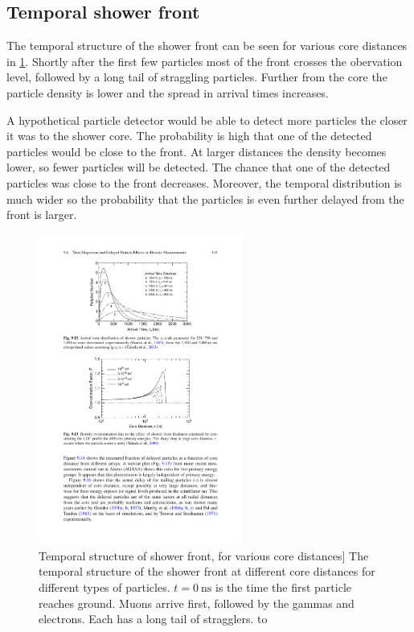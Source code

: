\subsection{Temporal shower front}

The temporal structure of the shower front can be seen for various core distances in \cref{fig:temporal_profile}. Shortly after the first few particles most of the front crosses the obervation level, followed by a long tail of straggling particles. Further from the core the particle density is lower and the spread in arrival times increases.

A hypothetical particle detector would be able to detect more particles the closer it was to the shower core. The probability is high that one of the detected particles would be close to the front. At larger distances the density becomes lower, so fewer particles will be detected. The chance that one of the detected particles was close to the front decreases. Moreover, the temporal distribution is much wider so the probability that the particles is even further delayed from the front is larger.

\begin{figure}
    \centering
    \includegraphics[width=0.6\textwidth]
                    {plots/cosmic-rays/temporal_profile}
    \caption{Temporal structure of shower front, for various core distances]
The temporal structure of the shower front at different core distances for different types of particles. $t = \SI{0}{\ns}$ is the time the first particle reaches ground. Muons arrive first, followed by the gammas and electrons. Each has a long tail of stragglers. \cite{grieder2010eas} to \cite{heck2013corsika}}
    \label{fig:temporal_profile}
\end{figure}


